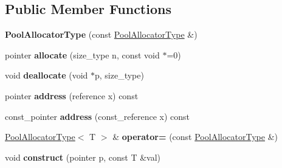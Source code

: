 \subsection*{Public Member Functions}
\begin{DoxyCompactItemize}
\item 
\mbox{\label{classCantMemory_1_1PoolAllocatorType_ad46c4bdf479e9c023d466cd3540b9749}} 
{\bfseries Pool\+Allocator\+Type} (const \hyperlink{classCantMemory_1_1PoolAllocatorType}{Pool\+Allocator\+Type} \&)
\item 
\mbox{\label{classCantMemory_1_1PoolAllocatorType_a3da540cbeb4d07b99e3ac4b4933aaf36}} 
pointer {\bfseries allocate} (size\+\_\+type n, const void $\ast$=0)
\item 
\mbox{\label{classCantMemory_1_1PoolAllocatorType_a3e8d9bb571d899dc0697da8a63fdca7c}} 
void {\bfseries deallocate} (void $\ast$p, size\+\_\+type)
\item 
\mbox{\label{classCantMemory_1_1PoolAllocatorType_a021d80ad67ca529171e5e2143a103956}} 
pointer {\bfseries address} (reference x) const
\item 
\mbox{\label{classCantMemory_1_1PoolAllocatorType_a66aa05e2dc248182dbbaaa02bd98c949}} 
const\+\_\+pointer {\bfseries address} (const\+\_\+reference x) const
\item 
\mbox{\label{classCantMemory_1_1PoolAllocatorType_aef13da61f8e7b65c56731fed19a0d225}} 
\hyperlink{classCantMemory_1_1PoolAllocatorType}{Pool\+Allocator\+Type}$<$ T $>$ \& {\bfseries operator=} (const \hyperlink{classCantMemory_1_1PoolAllocatorType}{Pool\+Allocator\+Type} \&)
\item 
\mbox{\label{classCantMemory_1_1PoolAllocatorType_a905bf076c0bf136f21ddf2465e4372b2}} 
void {\bfseries construct} (pointer p, const T \&val)
\item 
\mbox{\label{classCantMemory_1_1PoolAllocatorType_a9cf6829291189ca44d7e2a5115530969}} 

\end{DoxyCompactItemize}
